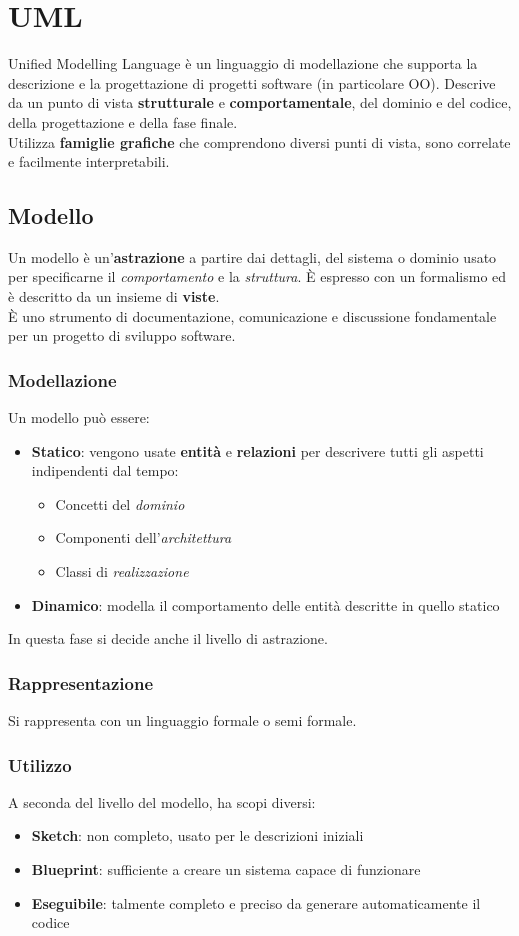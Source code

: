 \newpage
\section{UML}
Unified Modelling Language è un linguaggio di modellazione che supporta la descrizione e la progettazione di progetti software (in particolare OO). Descrive da un punto di vista \textbf{strutturale} e \textbf{comportamentale}, del dominio e del codice, della progettazione e della fase finale.\\
Utilizza \textbf{famiglie grafiche} che comprendono diversi punti di vista, sono correlate e facilmente interpretabili.
\subsection{Modello}
Un modello è un'\textbf{astrazione} a partire dai dettagli, del sistema o dominio usato per specificarne il \textit{comportamento} e la \textit{struttura}.  È espresso con un formalismo ed è descritto da un insieme di \textbf{viste}.\\
È uno strumento di documentazione, comunicazione e discussione fondamentale per un progetto di sviluppo software.

\subsubsection{Modellazione}
Un modello può essere:
\begin{itemize}
	\item \textbf{Statico}: vengono usate \textbf{entità} e \textbf{relazioni} per descrivere tutti gli aspetti indipendenti dal tempo:
	\begin{itemize}
		\item Concetti del \textit{dominio}
		\item Componenti dell'\textit{architettura}
		\item Classi di \textit{realizzazione}
	\end{itemize}
	\item \textbf{Dinamico}: modella il comportamento delle entità descritte in quello statico
\end{itemize} In questa fase si decide anche il livello di astrazione.
\subsubsection{Rappresentazione}
Si rappresenta con un linguaggio formale o semi formale.
\subsubsection{Utilizzo}
A seconda del livello del modello, ha scopi diversi:
\begin{itemize}
	\item \textbf{Sketch}: non completo, usato per le descrizioni iniziali
	\item \textbf{Blueprint}: sufficiente a creare un sistema capace di funzionare
	\item \textbf{Eseguibile}: talmente completo e preciso da generare automaticamente il codice
\end{itemize}

